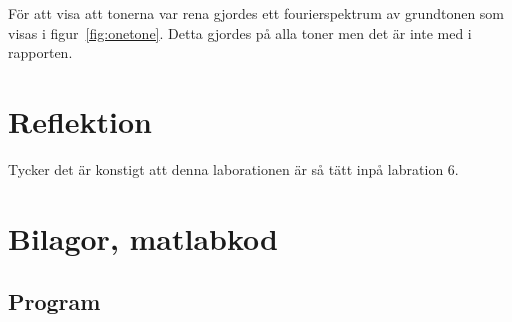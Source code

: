 \documentclass[12pt]{article}
\begin{document}
För att visa att tonerna var rena gjordes ett fourierspektrum av grundtonen som
visas i figur~\ref{fig:onetone}. Detta gjordes på alla toner men det är inte med
i rapporten.

\section{Reflektion}

Tycker det är konstigt att denna laborationen är så tätt inpå labration 6.

\section{Bilagor, matlabkod}
\label{sec:bilagor}

\subsection{Program}












\end{document}
